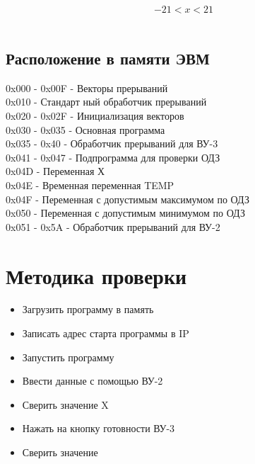 \documentclass[14pt]{extreport}
\begin{document}
        $$-21<x<21$$  \\

    \section{Расположение в памяти ЭВМ}
        0x000 - 0x00F - Векторы прерываний \\

        0x010 - Стандарт    ный обработчик прерываний \\

        0x020 - 0x02F - Инициализация векторов \\

        0x030 - 0x035 - Основная программа \\

        0x035 - 0x40 - Обработчик прерываний для ВУ-3 \\

        0x041 - 0x047 - Подпрограмма для проверки ОДЗ \\

        0x04D - Переменная Х \\

        0x04E - Временная переменная TEMP \\

        0x04F - Переменная с допустимым максимумом по ОДЗ \\

        0x050 - Переменная с допустимым минимумом по ОДЗ \\

        0x051 - 0x5A - Обработчик прерываний для ВУ-2 \\


    \chapter{Методика проверки}
        \begin{itemize}
            \item Загрузить программу в память
            \item Записать адрес старта программы в IP
            \item Запустить программу
            \item Ввести данные с помощью ВУ-2
            \item Сверить значение X
            \item Нажать на кнопку готовности ВУ-3
            \item Сверить значение
        \end{itemize}
\end{document}
